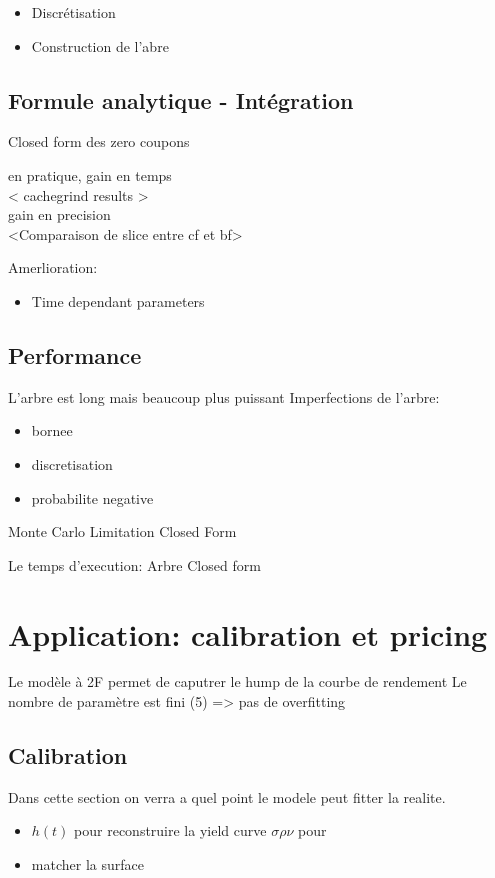 \documentclass[paper=a4, fontsize=11pt]{scrartcl}
\numberwithin{equation}{section}		%
\numberwithin{figure}{section}			%
\numberwithin{table}{section}				%
\begin{document}
\begin{itemize}
\item Discrétisation
\item Construction de l'abre
\end{itemize}

\subsection{Formule analytique - Intégration}
Closed form des zero coupons

en pratique, gain en temps \\
< cachegrind results > \\

gain en precision \\
<Comparaison de slice entre cf et bf>


Amerlioration:
\begin{itemize}
\item Time dependant parameters
\end{itemize}

\subsection{Performance}
L'arbre est long mais beaucoup plus puissant
Imperfections de l'arbre:
\begin{itemize}
\item  bornee
\item  discretisation
\item  probabilite negative
\end{itemize}
Monte Carlo
Limitation
Closed Form

Le temps d'execution:
Arbre
Closed form

\newpage
\section{Application: calibration et pricing}
Le modèle à 2F permet de caputrer le hump de la courbe de rendement
Le nombre de paramètre est fini (5) => pas de overfitting


\subsection{Calibration}
Dans cette section on verra a quel point le modele peut fitter la realite.

\begin{itemize}
\item $h(t)$ pour reconstruire la yield curve $\sigma \rho \nu$ pour
\item  matcher la surface
\end{itemize}
\end{document}
